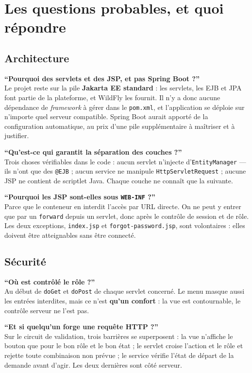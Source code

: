 \section{Les questions probables, et quoi répondre}

\subsection{Architecture}

\textbf{\enquote{Pourquoi des servlets et des JSP, et pas Spring Boot ?}}\\
Le projet reste sur la pile \textbf{Jakarta EE standard} : les servlets, les
EJB et JPA font partie de la plateforme, et WildFly les fournit. Il n'y a donc
aucune dépendance de \emph{framework} à gérer dans le \texttt{pom.xml}, et
l'application se déploie sur n'importe quel serveur compatible. Spring Boot
aurait apporté de la configuration automatique, au prix d'une pile
supplémentaire à maîtriser et à justifier.

\textbf{\enquote{Qu'est-ce qui garantit la séparation des couches ?}}\\
Trois choses vérifiables dans le code : aucun servlet n'injecte
d'\texttt{EntityManager} --- ils n'ont que des \texttt{@EJB} ; aucun service ne
manipule \texttt{HttpServletRequest} ; aucune JSP ne contient de scriptlet
Java. Chaque couche ne connaît que la suivante.

\textbf{\enquote{Pourquoi les JSP sont-elles sous \texttt{WEB-INF} ?}}\\
Parce que le conteneur en interdit l'accès par URL directe. On ne peut y entrer
que par un \texttt{forward} depuis un servlet, donc après le contrôle de
session et de rôle. Les deux exceptions, \texttt{index.jsp} et
\texttt{forgot-password.jsp}, sont volontaires : elles doivent être
atteignables sans être connecté.

\subsection{Sécurité}

\textbf{\enquote{Où est contrôlé le rôle ?}}\\
Au début de \texttt{doGet} et \texttt{doPost} de chaque servlet concerné. Le
menu masque aussi les entrées interdites, mais ce n'est \textbf{qu'un
confort} : la vue est contournable, le contrôle serveur ne l'est pas.

\textbf{\enquote{Et si quelqu'un forge une requête HTTP ?}}\\
Sur le circuit de validation, trois barrières se superposent : la vue
n'affiche le bouton que pour le bon rôle et le bon état ; le servlet croise
l'action et le rôle et rejette toute combinaison non prévue ; le service
vérifie l'état de départ de la demande avant d'agir. Les deux dernières sont
côté serveur.

